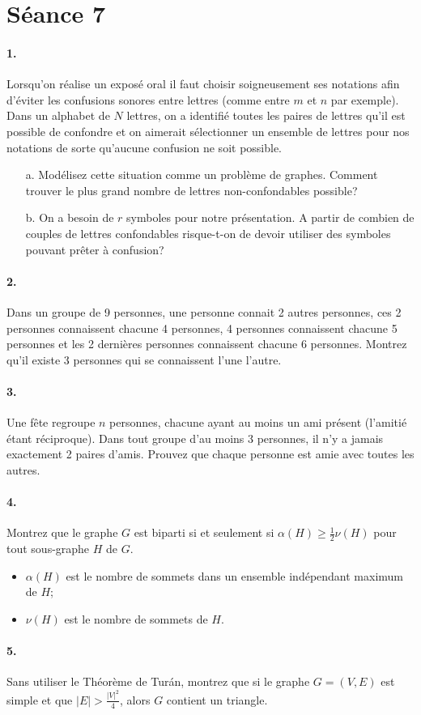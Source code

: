 \section{Séance 7}

\paragraph{1. } Lorsqu'on réalise un exposé oral il faut choisir soigneusement ses notations afin d'éviter les confusions sonores entre lettres (comme entre $m$ et $n$ par exemple). Dans un alphabet de $N$ lettres, on a identifié toutes les paires de lettres qu'il est possible de confondre et on aimerait sélectionner un ensemble de lettres pour nos notations de sorte qu'aucune confusion ne soit possible.
\begin{enumerate}
  \item[a.] Modélisez cette situation comme un problème de graphes. Comment trouver le plus grand nombre de lettres non-confondables possible?
  \item[b.] On a besoin de $r$ symboles pour notre présentation. A partir de combien de couples de lettres confondables risque-t-on de devoir utiliser des symboles pouvant prêter à confusion?
\end{enumerate}


\paragraph{2. } Dans un groupe de 9 personnes, une personne connait 2 autres personnes, ces 2 personnes connaissent chacune 4 personnes, 4 personnes connaissent chacune 5 personnes et les 2 dernières personnes connaissent chacune 6 personnes. Montrez qu'il existe 3 personnes qui se connaissent l'une l'autre.


\paragraph{3. } Une fête regroupe $n$ personnes, chacune ayant au moins un ami présent (l'amitié étant réciproque). Dans tout groupe d'au moins 3 personnes, il n'y a jamais exactement 2 paires d'amis. Prouvez que chaque personne est amie avec toutes les autres.


\paragraph{4. } Montrez que le graphe $G$ est biparti si et seulement si $\alpha(H) \geq \frac{1}{2} \nu(H)$ pour tout sous-graphe $H$ de $G$.
\begin{itemize}
  \item $\alpha(H)$ est le nombre de sommets dans un ensemble indépendant maximum de $H$;
  \item $\nu(H)$ est le nombre de sommets de $H$.
\end{itemize}


\paragraph{5. } Sans utiliser le Théorème de Turán, montrez que si le graphe $G = (V, E)$ est simple et que $|E| > \frac{|V|^2}{4}$, alors $G$ contient un triangle.
